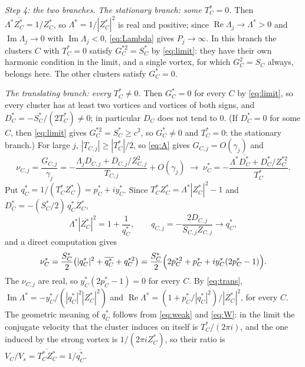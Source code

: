 \documentclass[11pt]{article}
\theoremstyle{definition}
\newcommand{\re}{\operatorname{Re}}
\newcommand{\im}{\operatorname{Im}}
\begin{document}
\emph{Step 4: the two branches.} \emph{The stationary branch: some $T_C^* = 0$.} Then $\Lambda^*\overline{Z_C^*} = 1/Z_C^*$, so $\Lambda^* = 1/|Z_C^*|^2$ is real and positive; since $\re\Lambda_j \to \Lambda^* > 0$ and $\im\Lambda_j \to 0$ with $\im\Lambda_j < 0$, \eqref{eq:Lambda} gives $P_j \to \infty$. In this branch the clusters $C$ with $T_C^* = 0$ satisfy $G_C^{*2} = S_C^*$ by \eqref{eq:limit}: they have their own harmonic condition in the limit, and a single vortex, for which $G_C^2 = S_C$ always, belongs here. The other clusters satisfy $G_C^* = 0$.

\emph{The translating branch: every $T_C^* \ne 0$.} Then $G_C^* = 0$ for every $C$ by \eqref{eq:limit}, so every cluster has at least two vortices and vortices of both signs, and $D_C^* = -S_C^*/(2T_C^*) \ne 0$; in particular $D_C$ does not tend to $0$. (If $D_C^* = 0$ for some $C$, then \eqref{eq:limit} gives $G_C^{*2} = S_C^* \ge c^2$, so $G_C^* \ne 0$ and $T_C^* = 0$: the stationary branch.) For large $j$, $|T_{C,j}| \ge |T_C^*|/2$, so \eqref{eq:A} gives $G_{C,j} = O(\gamma_j)$ and
\[
  \nu_{C,j} = \frac{G_{C,j}}{\gamma_j} = -\frac{\Lambda_j\overline{D_{C,j}} + D_{C,j}/Z_{C,j}^2}{T_{C,j}} + O(\gamma_j) \;\to\; \nu_C^* = -\frac{\Lambda^*\overline{D_C^*} + D_C^*/Z_C^{*2}}{T_C^*}.
\]
Put $q_C^* = 1/(T_C^*Z_C^*) = p_C^* + iy_C^*$. Since $T_C^*Z_C^* = \Lambda^*|Z_C^*|^2 - 1$ and $D_C^* = -(S_C^*/2)\,q_C^*Z_C^*$,
\begin{equation}\label{eq:trans}
  \Lambda^*|Z_C^*|^2 = 1 + \frac{1}{q_C^*}, \qquad q_{C,j} = -\frac{2D_{C,j}}{S_{C,j}Z_{C,j}} \to q_C^*,
\end{equation}
and a direct computation gives
\begin{equation}\label{eq:nu}
  \nu_C^* = \frac{S_C^*}{2}\bigl(|q_C^*|^2 + \overline{q_C^*} + q_C^{*2}\bigr) = \frac{S_C^*}{2}\Bigl(2p_C^{*2} + p_C^* + iy_C^*(2p_C^* - 1)\Bigr).
\end{equation}
The $\nu_{C,j}$ are real, so $y_C^*(2p_C^* - 1) = 0$ for every $C$. By \eqref{eq:trans}, $\im\Lambda^* = -y_C^*/(|q_C^*|^2|Z_C^*|^2)$ and $\re\Lambda^* = (1 + p_C^*/|q_C^*|^2)/|Z_C^*|^2$, for every $C$. The geometric meaning of $q_C^*$ follows from \eqref{eq:weak} and \eqref{eq:W}: in the limit the conjugate velocity that the cluster induces on itself is $T_C^*/(2\pi i)$, and the one induced by the strong vortex is $1/(2\pi iZ_C^*)$, so their ratio is $V_C/V_s = \overline{T_C^*Z_C^*} = 1/\overline{q_C^*}$.
\end{document}
